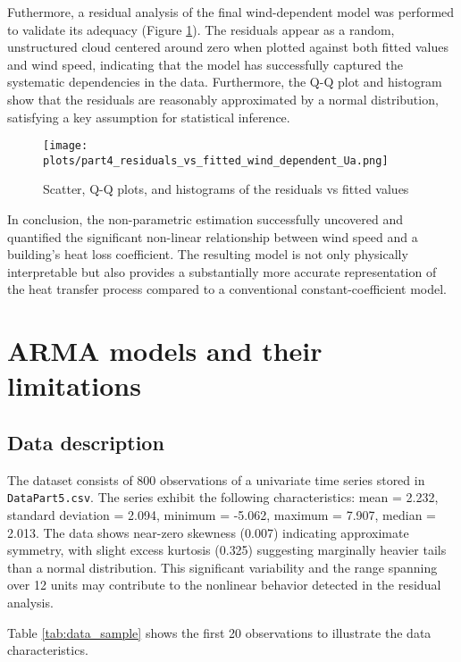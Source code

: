 \documentclass{article}
\begin{document}
Futhermore, a residual analysis of the final wind-dependent model was performed to validate its adequacy (Figure \ref{fig:part4_residuals_vs_fitted_wind_dependent_Ua}). The residuals appear as a random, unstructured cloud centered around zero when plotted against both fitted values and wind speed, indicating that the model has successfully captured the systematic dependencies in the data. Furthermore, the Q-Q plot and histogram show that the residuals are reasonably approximated by a normal distribution, satisfying a key assumption for statistical inference.

\begin{figure}[H]
    \centering
    \texttt{[image: plots/part4\_residuals\_vs\_fitted\_wind\_dependent\_Ua.png]}
    \caption{Scatter, Q-Q plots, and histograms of the residuals vs fitted values}
    \label{fig:part4_residuals_vs_fitted_wind_dependent_Ua}
\end{figure}

In conclusion, the non-parametric estimation successfully uncovered and quantified the significant non-linear relationship between wind speed and a building's heat loss coefficient. The resulting model is not only physically interpretable but also provides a substantially more accurate representation of the heat transfer process compared to a conventional constant-coefficient model.

\section{ARMA models and their limitations}

\subsection{Data description}

The dataset consists of 800 observations of a univariate time series stored in \texttt{DataPart5.csv}. The series exhibit the following characteristics: mean = 2.232, standard deviation = 2.094, minimum = -5.062, maximum = 7.907, median = 2.013. The data shows near-zero skewness (0.007) indicating approximate symmetry, with slight excess kurtosis (0.325) suggesting marginally heavier tails than a normal distribution. This significant variability and the range spanning over 12 units may contribute to the nonlinear behavior detected in the residual analysis.

Table \ref{tab:data_sample} shows the first 20 observations to illustrate the data characteristics.
\end{document}
